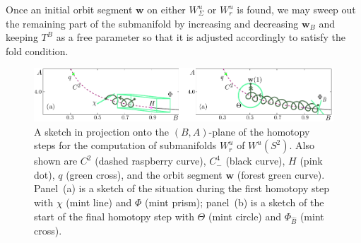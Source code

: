 \documentclass{ws-ijbc}
\begin{document}
Once an initial orbit segment $\mathbf{w}$ on either $W^u_\Sigma$ or $W^u_r$ is found, we may sweep out the remaining part of the submanifold by increasing and decreasing $\mathbf{w}_B$ and keeping $T^B$ as a free parameter so that it is adjusted accordingly to satisfy the fold condition.

\begin{figure}[t!]
\centering
\includegraphics[]{./figures/MKMO_7.pdf}
\caption{A sketch in projection onto the $(B,A)$-plane of the homotopy steps for the computation of submanifolds $W^u_r$ of $W^u(S^2)$.  Also shown are $C^2$ (dashed raspberry curve), $C^4_-$ (black curve), $H$ (pink dot), $q$ (green cross), and the orbit segment $\mathbf{w}$ (forest green curve).  Panel~(a) is a sketch of the situation during the first homotopy step with $\chi$ (mint line) and $\Phi$ (mint prism); panel~(b) is a sketch of the start of the final homotopy step with $\Theta$ (mint circle) and $\Phi_{\widehat{B}}$ (mint cross).}
\label{figure_7}
\end{figure} 
\end{document}
